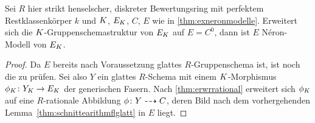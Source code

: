 \documentclass[german]{scrreprt}
\begin{document}
\begin{Satz}\label{thm:fallstriktehenselisierung}
  Sei $R$ hier strikt henselscher, diskreter Bewertungsring mit
  perfektem Restklassenkörper $k$
  und $K$, $E_{K}$, $C$, $E$ wie in \ref{thm:exneronmodelle}.
  Erweitert sich die $K$-Gruppenschemastruktur von $E_{K}$ auf
  $E=C^0$, dann ist $E$ Néron-Modell von $E_{K}$.
  \begin{proof}
    Da $E$ bereits nach Voraussetzung glattes $R$-Gruppenschema ist,
    ist noch die \NAbbEig zu prüfen.
    Sei also $Y$ ein glattes $R$-Schema mit einem $K$-Morphismus
    $\phi_{K}\colon Y_{K}\to E_{K}$ der generischen Fasern.
    Nach \ref{thm:erwrrational}
    erweitert sich $\phi_{K}$ auf eine
    $R$-rationale Abbildung $\phi\colon Y\dashrightarrow C$, deren Bild nach dem
    vorhergehenden Lemma~\ref{thm:schnittearithmflglatt} in $E$
    liegt.
    

\end{proof}
\end{Satz}
\end{document}
